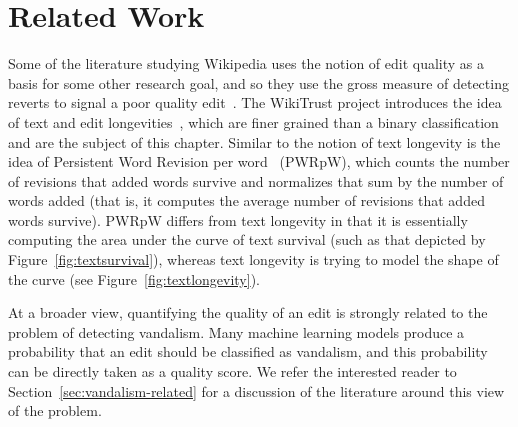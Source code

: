 \section{Related Work}

Some of the literature studying Wikipedia uses the notion of edit
quality as a basis for some other research goal, and so they use the
gross measure of detecting reverts to signal a poor quality
edit~\cite{Adler2007,Smets2008,Itakura2009,Belani2010}.
The WikiTrust project introduces the idea of text and edit
longevities~\cite{Adler2007}, which are finer grained than a
binary classification and are the subject of this chapter.
Similar to the notion of text longevity is the idea
of Persistent Word Revision per
word~\cite{Halfaker2009,Halfaker2011} (PWRpW),
which counts the number of revisions that added words survive
and normalizes that sum by the number of words added (that is,
it computes the average number of revisions that added words survive).
PWRpW differs from text longevity in that it is essentially computing
the area under the curve of text survival (such as that depicted by
Figure~\ref{fig:textsurvival}),
whereas text longevity is trying to model the shape of the curve
(see Figure~\ref{fig:textlongevity}).

At a broader view, quantifying the quality of an edit is strongly
related to the problem of detecting vandalism.
Many machine learning models produce a probability that an edit
should be classified as vandalism, and this probability can be
directly taken as a quality score.
We refer the interested reader to Section~\ref{sec:vandalism-related}
for a discussion of the literature around this view of the problem.

